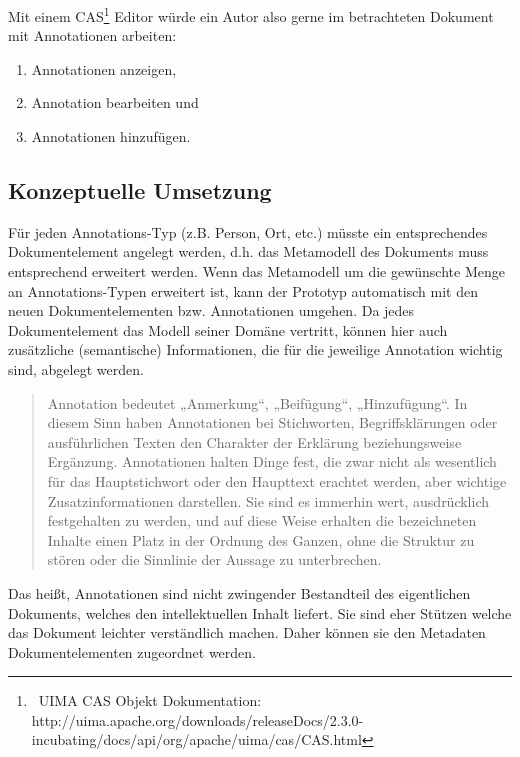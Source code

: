  
Mit einem CAS\footnote{~UIMA CAS Objekt Dokumentation: http://uima.apache.org/downloads/releaseDocs/2.3.0-incubating/docs/api/org/apache/uima/cas/CAS.html} Editor würde ein Autor also gerne im betrachteten Dokument mit Annotationen arbeiten:

 
\begin{enumerate}

\item Annotationen anzeigen,
\item Annotation bearbeiten und
\item Annotationen hinzufügen.
\end{enumerate}
 
\subsection{Konzeptuelle Umsetzung}\label{}
 
Für jeden Annotations-Typ (z.B. Person, Ort, etc.) müsste ein entsprechendes Dokumentelement angelegt werden, d.h. das Metamodell des Dokuments muss entsprechend erweitert werden. Wenn das Metamodell um die gewünschte Menge an Annotations-Typen erweitert ist, kann der Prototyp automatisch mit den neuen Dokumentelementen bzw. Annotationen umgehen. Da jedes Dokumentelement das Modell seiner Domäne vertritt, können hier auch zusätzliche (semantische) Informationen, die für die jeweilige Annotation wichtig sind, abgelegt werden.

 
\begin{quote}
 Annotation bedeutet „Anmerkung“, „Beifügung“, „Hinzufügung“. In diesem Sinn haben Annotationen bei Stichworten, Begriffsklärungen oder ausführlichen Texten den Charakter der Erklärung beziehungsweise Ergänzung. Annotationen halten Dinge fest, die zwar nicht als wesentlich für das Hauptstichwort oder den Haupttext erachtet werden, aber wichtige Zusatzinformationen darstellen. Sie sind es immerhin wert, ausdrücklich festgehalten zu werden, und auf diese Weise erhalten die bezeichneten Inhalte einen Platz in der Ordnung des Ganzen, ohne die Struktur zu stören oder die Sinnlinie der Aussage zu unterbrechen. \citep{WikiAnnotation}
\end{quote}
 
Das heißt, Annotationen sind nicht zwingender Bestandteil des eigentlichen Dokuments, welches den intellektuellen Inhalt liefert. Sie sind eher Stützen welche das Dokument leichter verständlich machen. Daher können sie den Metadaten Dokumentelementen zugeordnet werden.

